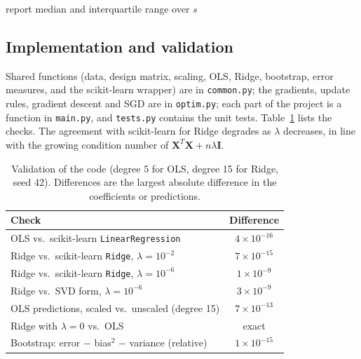 \begin{algorithm}
\caption{Repeated experiments}\label{alg:repeated}
report median and interquartile range over $s$\;
\end{algorithm}

\subsection{Implementation and validation}\label{sec:validation}

Shared functions (data, design matrix, scaling, OLS, Ridge, bootstrap, error measures, and the scikit-learn wrapper) are in \texttt{common.py}; the gradients, update rules, gradient descent and SGD are in \texttt{optim.py}; each part of the project is a function in \texttt{main.py}, and \texttt{tests.py} contains the unit tests. Table~\ref{tab:validation} lists the checks. The agreement with scikit-learn for Ridge degrades as $\lambda$ decreases, in line with the growing condition number of $\mathbf{X}^T\mathbf{X} + n\lambda\mathbf{I}$.

\begin{table}
    \centering
    \caption{Validation of the code (degree 5 for OLS, degree 15 for Ridge, seed 42). Differences are the largest absolute difference in the coefficients or predictions.}
    \label{tab:validation}
    \begin{tabular}{lc}
        \toprule
        Check & Difference \\
        \midrule
        OLS vs.\ scikit-learn \texttt{LinearRegression} & $4\times10^{-16}$ \\
        Ridge vs.\ scikit-learn \texttt{Ridge}, $\lambda = 10^{-2}$ & $7\times10^{-15}$ \\
        Ridge vs.\ scikit-learn \texttt{Ridge}, $\lambda = 10^{-6}$ & $1\times10^{-9}$ \\
        Ridge vs.\ SVD form, $\lambda = 10^{-6}$ & $3\times10^{-9}$ \\
        OLS predictions, scaled vs.\ unscaled (degree 15) & $7\times10^{-13}$ \\
        Ridge with $\lambda = 0$ vs.\ OLS & exact \\
        Bootstrap: error $-$ bias$^2$ $-$ variance (relative) & $1\times10^{-15}$ \\
        \bottomrule
    \end{tabular}
\end{table}

